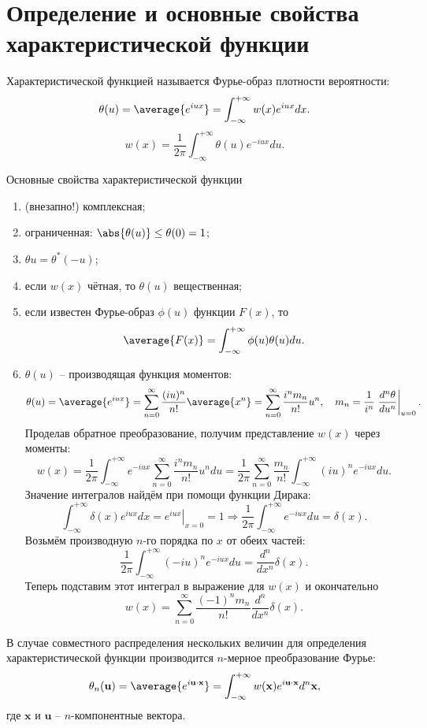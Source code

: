 \section{Определение и основные свойства характеристической функции}

Характеристической функцией называется Фурье-образ плотности вероятности:
\[
    \theta(u) = \average{e^{iux}} = \int_{-\infty}^{+\infty} w(x) e^{iux} dx.
\]
\[
    w(x) = \frac{1}{2\pi}\int_{-\infty}^{+\infty} \theta(u) e^{-iux} du.
\]

Основные свойства характеристической функции
\begin{enumerate}
    \item (внезапно!) комплексная;
    \item ограниченная: \( \abs{\theta(u)} \le \theta(0) = 1 \);
    \item \( \theta{u} = \theta^*(-u) \);
    \item если \( w(x) \) чётная, то \( \theta(u) \) вещественная;
    \item если известен Фурье-образ \( \phi(u) \) функции \( F(x) \), то
        \[
            \average{F(x)} = \int_{-\infty}^{+\infty} \phi(u)\theta(u) du.
        \]
    \item \( \theta(u) \) -- производящая функция моментов:
        \[
            \theta(u) = \average{e^{iux}} =
            \sum_{n=0}^\infty \frac{(iu)^n}{n!}\average{x^n} =
            \sum_{n=0}^\infty \frac{i^n m_n}{n!}u^n,\quad
            m_n = \frac{1}{i^n}\left.\frac{d^n\theta}{du^n}\right|_{u=0}.
        \]
        Проделав обратное преобразование, получим представление \( w(x) \) через
        моменты:
        \[
            w(x) = \frac{1}{2\pi}\int_{-\infty}^{+\infty} e^{-iux}
            \sum_{n=0}^\infty \frac{i^n m_n}{n!}u^n du =
            \frac{1}{2\pi} \sum_{n=0}^\infty \frac{m_n}{n!}
            \int_{-\infty}^{+\infty}(iu)^n e^{-iux} du.
        \]
        Значение интегралов найдём при помощи функции Дирака:
        \[
            \int_{-\infty}^{+\infty} \delta(x) e^{iux} dx =
            \left.e^{iux}\right|_{x=0} = 1 \Rightarrow
            \frac{1}{2\pi}\int_{-\infty}^{+\infty} e^{-iux} du = \delta(x).
        \]
        Возьмём производную \( n \)-го порядка по \( x \) от обеих частей:
        \[
             \frac{1}{2\pi}\int_{-\infty}^{+\infty} (-iu)^n e^{-iux} du =
             \frac{d^n}{dx^n}\delta(x).
        \]
        Теперь подставим этот интеграл в выражение для \( w(x) \) и
        окончательно
        \[
            w(x) =  \sum_{n=0}^\infty \frac{(-1)^n m_n}{n!}
                \frac{d^n}{dx^n}\delta(x).
        \]
\end{enumerate}
В случае совместного распределения нескольких величин для определения
характеристической функции производится \( n \)-мерное преобразование Фурье:
\[
    \theta_n(\textbf{u}) = \average{e^{i\textbf{u}\cdot\textbf{x}}} =
    \int_{-\infty}^{+\infty} w(\textbf{x}) e^{i \textbf{u}\cdot\textbf{x}}
    d^n \textbf{x},
\]
где \( \textbf{x} \) и \( \textbf{u} \) -- \( n \)-компонентные вектора.
